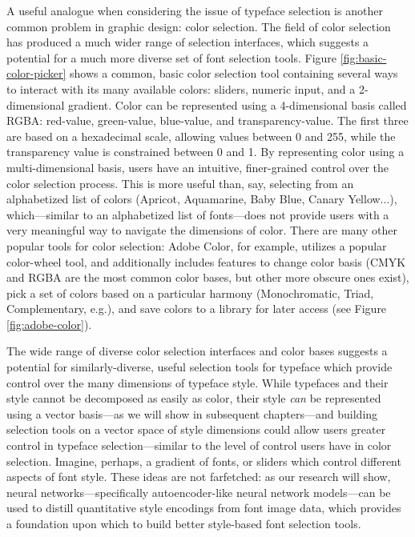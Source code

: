 A useful analogue when considering the issue of typeface selection is another common problem in graphic design: color selection. The field of color selection has produced a much wider range of selection interfaces, which suggests a potential for a much more diverse set of font selection tools. Figure \ref{fig:basic-color-picker} shows a common, basic color selection tool containing several ways to interact with its many available colors: sliders, numeric input, and a 2-dimensional gradient. Color can be represented using a 4-dimensional basis called RGBA: red-value, green-value, blue-value, and transparency-value. The first three are based on a hexadecimal scale, allowing values between 0 and 255, while the transparency value is constrained between 0 and 1. By representing color using a multi-dimensional basis, users have an intuitive, finer-grained control over the color selection process. This is more useful than, say, selecting from an alphabetized list of colors (Apricot, Aquamarine, Baby Blue, Canary Yellow...), which---similar to an alphabetized list of fonts---does not provide users with a very meaningful way to navigate the dimensions of color. There are many other popular tools for color selection: Adobe Color, for example, utilizes a popular color-wheel tool, and additionally includes features to change color basis (CMYK and RGBA are the most common color bases, but other more obscure ones exist), pick a set of colors based on a particular harmony (Monochromatic, Triad, Complementary, e.g.), and save colors to a library for later access (see Figure \ref{fig:adobe-color}).

The wide range of diverse color selection interfaces and color bases suggests a potential for similarly-diverse, useful selection tools for typeface which provide control over the many dimensions of typeface style. While typefaces and their style cannot be decomposed as easily as color, their style \emph{can} be represented using a vector basis---as we will show in subsequent chapters---and building selection tools on a vector space of style dimensions could allow users greater control in typeface selection---similar to the level of control users have in color selection. Imagine, perhaps, a gradient of fonts, or sliders which control different aspects of font style. These ideas are not farfetched: as our research will show, neural networks---specifically autoencoder-like neural network models---can be used to distill quantitative style encodings from font image data, which provides a foundation upon which to build better style-based font selection tools.

